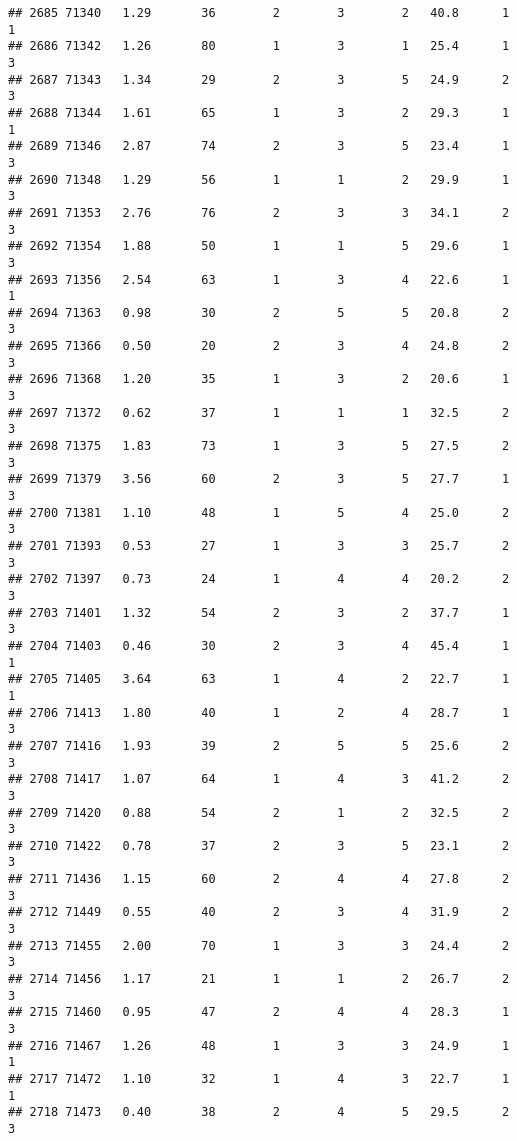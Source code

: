 \documentclass[
]{article}
\begin{document}
\begin{verbatim}
## 2685 71340   1.29       36        2        3        2   40.8      1      1
## 2686 71342   1.26       80        1        3        1   25.4      1      3
## 2687 71343   1.34       29        2        3        5   24.9      2      3
## 2688 71344   1.61       65        1        3        2   29.3      1      1
## 2689 71346   2.87       74        2        3        5   23.4      1      3
## 2690 71348   1.29       56        1        1        2   29.9      1      3
## 2691 71353   2.76       76        2        3        3   34.1      2      3
## 2692 71354   1.88       50        1        1        5   29.6      1      3
## 2693 71356   2.54       63        1        3        4   22.6      1      1
## 2694 71363   0.98       30        2        5        5   20.8      2      3
## 2695 71366   0.50       20        2        3        4   24.8      2      3
## 2696 71368   1.20       35        1        3        2   20.6      1      3
## 2697 71372   0.62       37        1        1        1   32.5      2      3
## 2698 71375   1.83       73        1        3        5   27.5      2      3
## 2699 71379   3.56       60        2        3        5   27.7      1      3
## 2700 71381   1.10       48        1        5        4   25.0      2      3
## 2701 71393   0.53       27        1        3        3   25.7      2      3
## 2702 71397   0.73       24        1        4        4   20.2      2      3
## 2703 71401   1.32       54        2        3        2   37.7      1      3
## 2704 71403   0.46       30        2        3        4   45.4      1      1
## 2705 71405   3.64       63        1        4        2   22.7      1      1
## 2706 71413   1.80       40        1        2        4   28.7      1      3
## 2707 71416   1.93       39        2        5        5   25.6      2      3
## 2708 71417   1.07       64        1        4        3   41.2      2      3
## 2709 71420   0.88       54        2        1        2   32.5      2      3
## 2710 71422   0.78       37        2        3        5   23.1      2      3
## 2711 71436   1.15       60        2        4        4   27.8      2      3
## 2712 71449   0.55       40        2        3        4   31.9      2      3
## 2713 71455   2.00       70        1        3        3   24.4      2      3
## 2714 71456   1.17       21        1        1        2   26.7      2      3
## 2715 71460   0.95       47        2        4        4   28.3      1      3
## 2716 71467   1.26       48        1        3        3   24.9      1      1
## 2717 71472   1.10       32        1        4        3   22.7      1      1
## 2718 71473   0.40       38        2        4        5   29.5      2      3

\end{verbatim}
\end{document}
